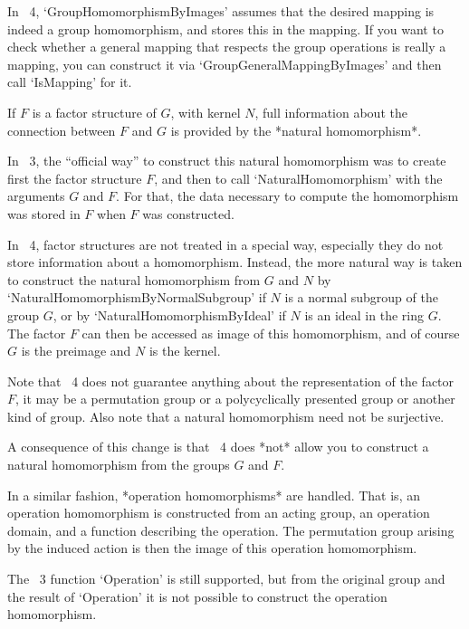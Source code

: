 In {\GAP}~4, `GroupHomomorphismByImages' assumes that the desired mapping
is indeed a group homomorphism, and stores this in the mapping.
If you want to check whether a general mapping that respects the group
operations is really a mapping, you can construct it via
`GroupGeneralMappingByImages' and then call `IsMapping' for it.



If $F$ is a factor structure of $G$, with kernel $N$,
full information about the connection between $F$ and $G$ is provided by
the *natural homomorphism*.

In {\GAP}~3, the ``official way'' to construct this natural homomorphism
was to create first the factor structure $F$, and then to call
`NaturalHomomorphism' with the arguments $G$ and $F$.
For that, the data necessary to compute the homomorphism was stored in
$F$ when $F$ was constructed.

In {\GAP}~4, factor structures are not treated in a special way,
especially they do not store information about a homomorphism.
Instead, the more natural way is taken to construct the natural
homomorphism from $G$ and $N$ by `NaturalHomomorphismByNormalSubgroup'
if $N$ is a normal subgroup of the group $G$,
or by `NaturalHomomorphismByIdeal' if $N$ is an ideal in the ring $G$.
The factor $F$ can then be accessed as image of this homomorphism,
and of course $G$ is the preimage and $N$ is the kernel.

Note that {\GAP}~4 does not guarantee anything about the representation
of the factor $F$, it may be a permutation group or a polycyclically
presented group or another kind of group.
Also note that a natural homomorphism need not be surjective.

A consequence of this change is that {\GAP}~4 does *not* allow you to
construct a natural homomorphism from the groups $G$ and $F$.

In a similar fashion, *operation homomorphisms* are handled.
That is, an operation homomorphism is constructed from an acting group,
an operation domain, and a function describing the operation.
The permutation group arising by the induced action is then the image
of this operation homomorphism.

The {\GAP}~3 function `Operation' is still supported,
but from the original group and the result of `Operation' it is not
possible to construct the operation homomorphism.


